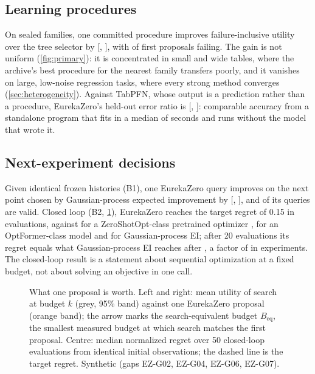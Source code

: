 \subsection{Learning procedures}

On \syn[EZ-G20]{\EZnA} sealed families, one committed procedure improves failure-inclusive utility over
the tree selector by \syn[EZ-G01]{\EZdA} [\syn[EZ-G01]{\EZdAlo}, \syn[EZ-G01]{\EZdAhi}], with
\syn[EZ-G01]{\EZfailA\%} of first proposals failing. The gain is not uniform (\cref{fig:primary}):
it is concentrated in small and wide tables, where the archive's best procedure for the nearest
family transfers poorly, and it vanishes on large, low-noise regression tasks, where every strong
method converges (\cref{sec:heterogeneity}). Against TabPFN, whose output is a prediction rather than
a procedure, EurekaZero's held-out error ratio is \syn[EZ-G08]{\EZtabpfnRatio} [\syn[EZ-G08]{\EZtabpfnLo},
\syn[EZ-G08]{\EZtabpfnHi}]: comparable accuracy from a standalone program that fits in a median of
\syn[EZ-G08]{\EZfitMedian} seconds and runs without the model that wrote it.

\subsection{Next-experiment decisions}

Given identical frozen histories (B1), one EurekaZero query improves on the next point chosen by
Gaussian-process expected improvement \citep{snoek2012bo,balandat2020botorch} by \syn[EZ-G03]{\EZdB}
[\syn[EZ-G03]{\EZdBlo}, \syn[EZ-G03]{\EZdBhi}], and \syn[EZ-G03]{\EZvalidB\%} of its queries are valid.
Closed loop (B2, \cref{fig:curves}), EurekaZero reaches the target regret of 0.15 in
\syn[EZ-G04]{\EZreachEZ} evaluations, against \syn[EZ-G04]{\EZreachZS} for a ZeroShotOpt-class pretrained
optimizer \citep{meindl2025zeroshotopt}, \syn[EZ-G04]{\EZreachOF} for an OptFormer-class model
\citep{chen2022optformer} and \syn[EZ-G04]{\EZreachGPEI} for Gaussian-process EI; after 20 evaluations
its regret equals what Gaussian-process EI reaches after \syn[EZ-G04]{\EZkeqBtwenty}, a factor of
\syn[EZ-G04]{\EZsaveB} in experiments. The closed-loop result is a statement about sequential
optimization at a fixed budget, not about solving an objective in one call.

\begin{figure}[t]
\centering

\caption{What one proposal is worth. Left and right: mean utility of search at budget $k$ (grey,
95\% band) against one EurekaZero proposal (orange band); the arrow marks the search-equivalent budget
$B_{\mathrm{eq}}$, the smallest measured budget at which search matches the first proposal. Centre:
median normalized regret over 50 closed-loop evaluations from identical initial observations; the
dashed line is the target regret. Synthetic (gaps EZ-G02, EZ-G04, EZ-G06, EZ-G07).}
\label{fig:curves}
\end{figure}

